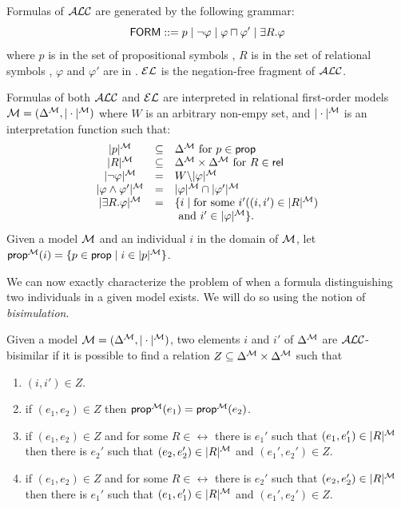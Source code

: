 \begin{definition}
Formulas of $\mathcal{ALC}$ are generated by the following grammar:
$$
\textsf{FORM} ::= p \mid \neg \varphi \mid \varphi \sqcap \varphi' \mid \exists R. \varphi
$$
where $p$ is in the set of propositional symbols \prop, $R$ is in the set of relational symbols \rel, $\varphi$ and $\varphi'$ are in \form. $\mathcal{EL}$ is the
negation-free fragment of $\mathcal{ALC}$.

Formulas of both $\mathcal{ALC}$ and $\mathcal{EL}$ are interpreted in relational first-order models
$\mathcal{M} = (\Delta^{\mathcal{M}},|\cdot|^{\mathcal{M}})$ where $W$ is an arbitrary non-empy set, and $|\cdot|^{\mathcal{M}}$ is an interpretation
function such that:
$$
\begin{array}{ccl}
|p|^{\mathcal{M}} & \subseteq & \Delta^{\mathcal{M}}  \mbox{ for $p \in \textsf{prop}$}\\
|R|^{\mathcal{M}} & \subseteq & \Delta^{\mathcal{M}} \times \Delta^{\mathcal{M}}  \mbox{ for $R \in \textsf{rel}$}\\
|\neg \varphi|^{\mathcal{M}} & = & W \backslash |\varphi|^{\mathcal{M}}\\
|\varphi \wedge \varphi'|^{\mathcal{M}} & = & |\varphi|^{\mathcal{M}} \cap |\varphi'|^{\mathcal{M}}\\
|\exists R.\varphi|^{\mathcal{M}} & = & \{i \mid \mbox{for some } i' ((i,i') \in |R|^{\mathcal{M}})\\
& & \mbox{ and } i' \in |\varphi|^{\mathcal{M}} \}.\\
\end{array}
$$
Given a model $\mathcal{M}$ and an individual $i$ in the domain of $\mathcal{M}$, let
$\textsf{prop}^{\mathcal{M}}(i) = \{p \in \textsf{prop} \mid i \in |p|^{\mathcal{M}}\}$.
\end{definition}

We can now exactly characterize the problem of when a formula distinguishing two
individuals in a given model exists. We will do so using the notion of \emph{bisimulation}.

\begin{definition}
Given a model $\mathcal{M} = (\Delta^{\mathcal{M}},|\cdot|^{\mathcal{M}})$, two elements $i$ and $i'$ of $\Delta^{\mathcal{M}}$ are $\mathcal{ALC}$-bisimilar if it is possible to find a relation $Z \subseteq \Delta^{\mathcal{M}} \times \Delta^{\mathcal{M}}$ such that
\begin{enumerate}
\item $(i,i') \in Z$.
\item if $(e_1, e_2) \in Z$ then $\textsf{prop}^{\mathcal{M}}(e_1) = \textsf{prop}^{\mathcal{M}}(e_2)$.
\item if $(e_1,e_2) \in Z$ and for some $R \in \rel$ there is $e_1'$ such that
$(e_1,e_1') \in |R|^{\mathcal{M}}$ then there is $e_2'$ such that $(e_2,e_2') \in |R|^{\mathcal{M}}$ and
$(e_1',e_2') \in Z$.
\item if $(e_1,e_2) \in Z$ and for some $R \in \rel$ there is $e_2'$ such that
$(e_2,e_2') \in |R|^{\mathcal{M}}$ then there is $e_1'$ such that $(e_1,e_1') \in |R|^{\mathcal{M}}$ and
$(e_1',e_2') \in Z$.
\end{enumerate}
\end{definition}

